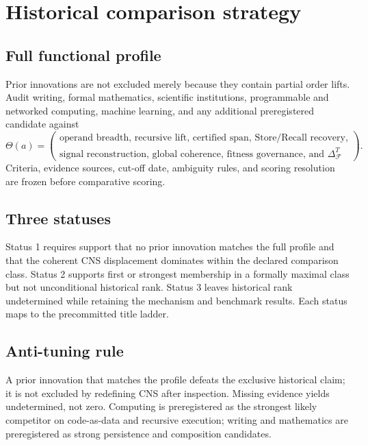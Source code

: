 \documentclass[11pt]{article}
\newcommand{\F}{\mathcal{F}}
\begin{document}
\section{Historical comparison strategy}

\subsection{Full functional profile}

Prior innovations are not excluded merely because they contain partial order lifts. Audit writing, formal mathematics, scientific institutions, programmable and networked computing, machine learning, and any additional preregistered candidate against
\begin{equation}
\Theta(a)=\left(
\begin{array}{c}
\text{operand breadth, recursive lift, certified span, Store/Recall recovery,}\\
\text{signal reconstruction, global coherence, fitness governance, and }\Delta_{\F}^{T}
\end{array}
\right).
\end{equation}
Criteria, evidence sources, cut-off date, ambiguity rules, and scoring resolution are frozen before comparative scoring.

\subsection{Three statuses}

Status 1 requires support that no prior innovation matches the full profile and that the coherent CNS displacement dominates within the declared comparison class. Status 2 supports first or strongest membership in a formally maximal class but not unconditional historical rank. Status 3 leaves historical rank undetermined while retaining the mechanism and benchmark results. Each status maps to the precommitted title ladder.

\subsection{Anti-tuning rule}

A prior innovation that matches the profile defeats the exclusive historical claim; it is not excluded by redefining CNS after inspection. Missing evidence yields undetermined, not zero. Computing is preregistered as the strongest likely competitor on code-as-data and recursive execution; writing and mathematics are preregistered as strong persistence and composition candidates.
\end{document}
